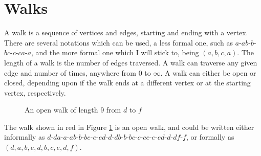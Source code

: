 
\section*{Walks}

A walk is a sequence of vertices and edges, starting and ending with a vertex. There are several notations which can be
 used, a less formal one, such as $a$-$ab$-$b$-$bc$-$c$-$ca$-$a$, and the more formal one which I will stick to, being
 $(a, b, c, a)$. The length of a walk is the number of edges traversed. A walk can traverse any given edge and number of
 times, anywhere from $0$ to $\infty$. A walk can either be open or closed, depending upon if the walk ends at a
 different vertex or at the starting vertex, respectively.

\begin{minipage}[c]{0.45\linewidth}
  \begin{figure}[H]
    \centering
    \usetikzlibrary{graphs}
    \caption{An open walk of length 9 from $d$ to $f$}
    \label{fig:walk1}
  \end{figure}
\end{minipage}\hfill
\begin{minipage}{0.45\linewidth}
The walk shown in red in Figure \ref*{fig:walk1} is an open walk, and could be written either informally as
$d$-$da$-$a$-$ab$-$b$-$be$-$e$-$ed$-$d$-$db$-$b$-$bc$-$c$-$ce$-$e$-$ed$-$d$-$df$-$f$, or formally as
$(d, a, b, e, d, b, c, e, d, f)$.
\end{minipage}


